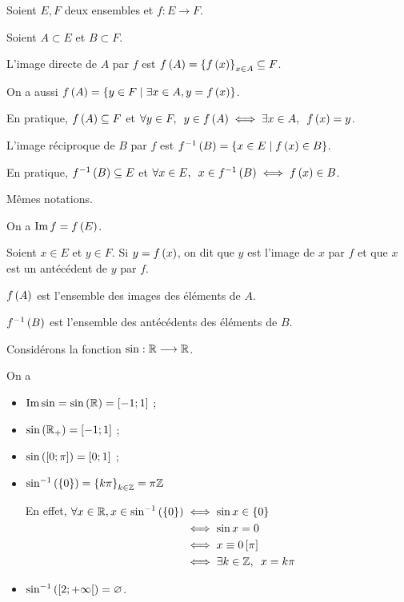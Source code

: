 \begin{defi}
Soient \(E,F\) deux ensembles et \(f:E\to F\).

Soient \(A\subset E\) et \(B\subset F\).

L'image directe de \(A\) par \(f\) est \(f\left(A\right)=\left\lbrace f\left(x\right)\right\rbrace_{x\in A}\subseteq F\).

On a aussi \(f\left(A\right)=\left\lbrace y\in F\;\middle|\;\exists x\in A,y=f\left(x\right)\right\rbrace\).

En pratique, \(f\left(A\right)\subseteq F\) et \(\quantifs{\forall y\in F}y\in f\paren{A}\ssi\quantifs{\exists x\in A}f\paren{x}=y\).

L'image réciproque de \(B\) par \(f\) est \(f^{-1}\left(B\right)=\left\lbrace x\in E\;\middle|\; f\left(x\right)\in B\right\rbrace\).

En pratique, \(f^{-1}\left(B\right)\subseteq E\) et \(\quantifs{\forall x\in E}x\in f^{-1}\paren{B}\ssi f\paren{x}\in B\).
\end{defi}

\begin{rem}
Mêmes notations.

On a \(\operatorname{Im} f=f\left(E\right)\).

Soient \(x\in E\) et \(y\in F\). Si \(y=f\left(x\right)\), on dit que \(y\) est l'image de \(x\) par \(f\) et que \(x\) est un antécédent de \(y\) par \(f\).

\(f\left(A\right)\) est l'ensemble des images des éléments de \(A\).

\(f^{-1}\left(B\right)\) est l'ensemble des antécédents des éléments de \(B\).
\end{rem}

\begin{ex}
Considérons la fonction \(\sin:\mathbb{R}\longrightarrow\mathbb{R}\).

On a \begin{itemize}
\item \(\operatorname{Im}\sin=\sin\left(\mathbb{R}\right)=\left[-1;1\right]\) ;

\item \(\sin\left(\mathbb{R}_+\right)=\left[-1;1\right]\) ;

\item \(\sin\left(\left[0;\pi\right]\right)=\left[0;1\right]\) ;

\item \(\sin^{-1}\left(\left\lbrace0\right\rbrace\right)=\left\lbrace k\pi\right\rbrace_{k\in\mathbb{Z}}=\pi\mathbb{Z}\)

En effet, \(\begin{aligned}[t]
\forall x\in\R,x\in\sin^{-1}\paren{\accol{0}}&\iff\sin x\in\accol{0} \\
&\iff\sin x=0 \\
&\iff x\equiv0\croch{\pi} \\
&\iff\quantifs{\exists k\in\Z}x=k\pi
\end{aligned}\)

\item \(\sin^{-1}\left(\left[2;+\infty\right[\right)=\varnothing\).
\end{itemize}
\end{ex}

